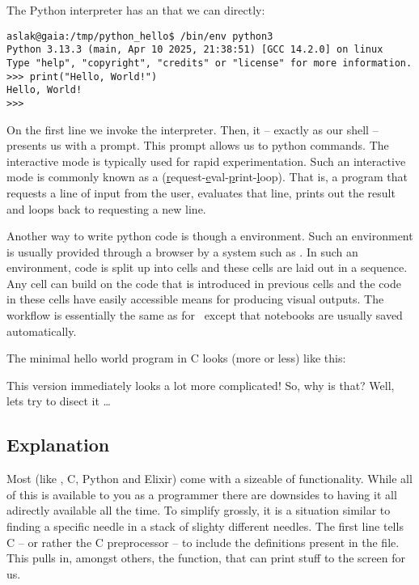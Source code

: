 The Python interpreter has an  that we can  directly:

\begin{verbatim}
aslak@gaia:/tmp/python_hello$ /bin/env python3
Python 3.13.3 (main, Apr 10 2025, 21:38:51) [GCC 14.2.0] on linux
Type "help", "copyright", "credits" or "license" for more information.
>>> print("Hello, World!")
Hello, World!
>>> 
\end{verbatim}

On the first line we invoke the interpreter. Then, it -- exactly as our shell -- presents us with a prompt. This prompt allows us to  python commands. The interactive mode is typically used for rapid experimentation. Such an interactive mode is commonly known as a  (\underline{r}equest-\underline{e}val-\underline{p}rint-\underline{l}oop). That is, a program that requests a line of input from the user, evaluates that line, prints out the result and loops back to requesting a new line.

Another way to write python code is though a  environment. Such an environment is usually provided through a browser by a system such as . In such an environment, code is split up into cells and these cells are laid out in a sequence. Any cell can build on the code that is introduced in previous cells and the code in these cells have easily accessible means for producing visual outputs. The workflow is essentially the same as for \csharp\ except that notebooks are usually saved automatically.


The minimal hello world program in C looks (more or less) like this:


This version immediately looks a lot more complicated! So, why is that? Well, lets try to disect it \ldots

\subsection{Explanation}

Most  (like \csharp, C, Python and Elixir) come with a sizeable  of functionality. While all of this is available to you as a programmer there are downsides to having it all adirectly available all the time. To simplify grossly, it is a situation similar to finding a specific needle in a stack of slighty different needles. The first line tells C -- or rather the C preprocessor -- to include the definitions present in the  file. This pulls in, amongst others, the  function, that can print stuff to the screen for us.

